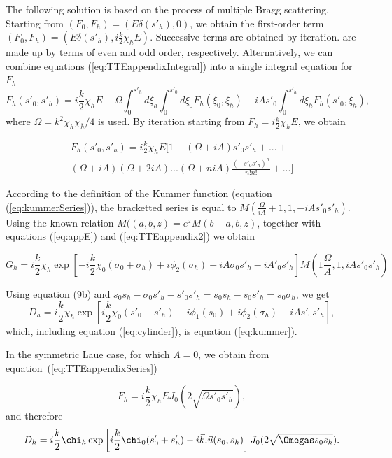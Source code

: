 \documentclass[preprint]{iucr}              %
\newcommand{\inred}[1]{{\color{red}#1}}
\begin{document}
The following solution is based on the process of multiple Bragg scattering. Starting from 
$(F_0,F_h)=(E\delta(s'_h),0)$, we obtain the first-order term  $(F_0,F_h)=(E\delta(s'_h), i\frac{k}{2}\chi_{h}E)$. Successive terms are obtained by iteration.  are made up by terms of  even and odd order, respectively. Alternatively, we can combine equations (\ref{eq:TTEappendixIntegral}) into a single integral equation \inred{for $F_h$}
\begin{equation}
    \label{eq:TTEappendixSingleIntegral}
    F_h(s'_0,s'_h) = i\frac{k}{2}\chi_h E - \Omega \int_0^{s'_h} d \xi_h \int_0^{s'_0} d\xi_0 F_h(\xi_0,\xi_h) - i A s'_0 \int_0^{s'_h} d\xi_h F_h(s'_0,\xi_h),
\end{equation}
\inred{where $\Omega=k^2\chi_h\chi_{\bar h}/4$ is used.} By iteration starting from $F_h=i\frac{k}{2}\chi_hE$, we obtain

\begin{align}
    \label{eq:TTEappendixSeries}
    F_h(s'_0,s'_h) = i\frac{k}{2}\chi_h E [ 1 - 
    (\Omega+i A) s'_0s'_h + ...+
    \nonumber \\
    (\Omega+iA)(\Omega+2iA)...(\Omega+niA)
    \frac{(-s'_0 s'_h)^n}{n!n!}
    +...]
\end{align}

\inred{According to the definition of the Kummer function (equation (\ref{eq:kummerSeries})), the bracketted series is equal to $M(\frac{\Omega}{iA}+1, 1, -iA s'_0 s'_h)$. Using the known relation
$M((a,b,z)=e^z M(b-a,b,z)$, together with equations (\ref{eq:appE}) and (\ref{eq:TTEappendix2}) we obtain

\begin{equation}
    G_h = i\frac{k}{2}\chi_h \exp\left[-i \frac{k}{2} \chi_0 (\sigma_0+\sigma_h)+ i \phi_2(\sigma_h)-i A \sigma_0 s'_h - i A '_0 s'_h\right] M(1\frac{\Omega}{A},1,i A s'_0 s'_h)
\end{equation}

Using equation (9b) and $s_0s_h-\sigma_0 s'_h - s'_0 s'_h=s_0 s_h - s_0 s'_h = s_0 \sigma_h$, we get
\begin{equation}
    D_h = i \frac{k}{2} \chi_h \exp\left[  i \frac{k}{2} \chi_0 (s'_0+s'_h) - i\phi_1(s_0) + i \phi_2(\sigma_h) - iA s'_0 s'_h \right], 
\end{equation}
which, including equation (\ref{eq:cylinder}), is equation (\ref{eq:kummer}).

In the symmetric Laue case, for which $A=0$, we obtain from equation~(\ref{eq:TTEappendixSeries})

\begin{equation}
    F_h = i \frac{k}{2} \chi_h E J_0(2 \sqrt{\Omega s'_0 s'_h}),
\end{equation}
and therefore
\begin{equation}
    D_h = i \frac{k}{2} \chi_h \exp\left[  i \frac{k}{2} \chi_0 (s'_0+s'_h) - i \vec k . \vec u(s_0,s_h) \right] J_0(2\sqrt{\Omegas s_0 s_h}).
\end{equation}

}
\end{document}
